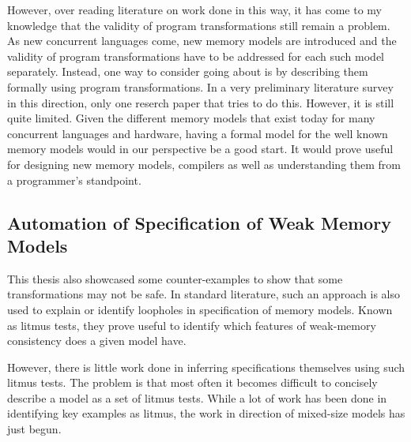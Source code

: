         However, over reading literature on work done in this way, it has come to my knowledge that the validity of program transformations still remain a problem. As new concurrent languages come, new memory models are introduced and the validity of program transformations have to be addressed for each such model separately. Instead, one way to consider going about is by describing them formally using program transformations. In a very preliminary literature survey in this direction, only one reserch paper \cite{Lahav2} that tries to do this. However, it is still quite limited. Given the different memory models that exist today for many concurrent languages and hardware, having a formal model for the well known memory models would in our perspective be a good start. It would prove useful for designing new memory models, compilers as well as understanding them from a programmer's standpoint. 

    \subsection{Automation of Specification of Weak Memory Models}

        This thesis also showcased some counter-examples to show that some transformations may not be safe. In standard literature, such an approach is also used to explain or identify loopholes in specification of memory models. Known as litmus tests, they prove useful to identify which features of weak-memory consistency does a given model have. 

        However, there is little work done in inferring specifications themselves using such litmus tests. The problem is that most often it becomes difficult to concisely describe a model as a set of litmus tests. While a lot of work has been done in identifying key examples as litmus, the work in direction of mixed-size models has just begun. 

